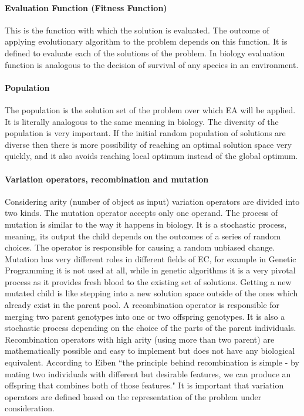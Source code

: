 \paragraph{Evaluation Function (Fitness Function)}
This is the function with which the solution is evaluated. The outcome of applying evolutionary algorithm to the problem depends on this function. It is defined to evaluate each of the solutions of the problem. In biology evaluation function is analogous to the decision of survival of any species in an environment. 

\paragraph{Population}
The population is the solution set of the problem over which EA will be applied. It is literally analogous to the same meaning in biology. The diversity of the population is very important. If the initial random population of solutions are diverse then there is more possibility of reaching an optimal solution space very quickly, and it also avoids reaching local optimum instead of the global optimum.

\paragraph{Variation operators, recombination and mutation}
Considering arity (number of object as input) variation operators are divided into two kinds. The mutation operator accepts only one operand. The process of mutation is similar to the way it happens in biology. It is a stochastic process, meaning, its output the child depends on the outcomes of a series of random choices. The operator is responsible for causing a random unbiased change. Mutation has very different roles in different fields of EC, for example in Genetic Programming it is not used at all, while in genetic algorithms it is a very pivotal process as it provides fresh blood to the existing set of solutions. Getting a new mutated child is like stepping into a new solution space outside of the ones which already exist in the parent pool. A recombination operator is responsible for merging two parent genotypes into one or two offspring genotypes. It is also a stochastic process depending on the choice of the parts of the parent individuals. Recombination operators with high arity (using more than two parent) are mathematically possible and easy to implement but does not have any biological equivalent. According to Eiben \cite{eiben2003} ``the principle behind recombination is simple - by mating two individuals with different but desirable features, we can produce an offspring that combines both of those features." It is important that variation operators are defined based on the representation of the problem under consideration. 

